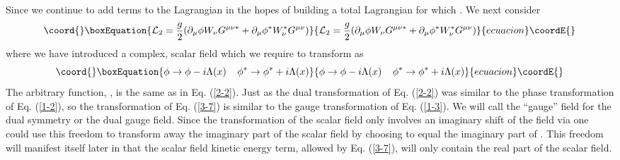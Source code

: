 \documentclass[a4paper,aps]{revtex4}
\begin{document}
Since \coordHE{} we continue to
add terms to the Lagrangian in the hopes of building
a total Lagrangian for which \coordHE{}.
We next consider
\begin{equation}\coord{}\boxEquation{
\label{3-6}
{\cal L} _2 = \frac{g}{2}(\partial _{\mu} \phi W_{\nu} G^{\mu \nu \ast}
+\partial _{\mu} \phi ^{\ast} W_{\nu} ^{\ast} G^{\mu \nu})
}{
{\cal L} _2 = \frac{g}{2}(\partial _{\mu} \phi W_{\nu} G^{\mu \nu \ast}
+\partial _{\mu} \phi ^{\ast} W_{\nu} ^{\ast} G^{\mu \nu})
}{ecuacion}\coordE{}\end{equation}
where we have introduced a complex, scalar field \myHighlight{$\phi$}\coordHE{} which
we require to transform as
\begin{equation}\coord{}\boxEquation{
\label{3-7}
\phi \rightarrow \phi - i \Lambda (x)
\; \; \; \;
\phi^{\ast} \rightarrow \phi ^{\ast} + i \Lambda (x)
}{
\phi \rightarrow \phi - i \Lambda (x)
\; \; \; \;
\phi^{\ast} \rightarrow \phi ^{\ast} + i \Lambda (x)
}{ecuacion}\coordE{}\end{equation}
The arbitrary function, \coordHE{}, is the same
as in Eq. (\ref{2-2}). Just as the dual transformation of
Eq. (\ref{2-2}) was similar to the phase transformation of
Eq. (\ref{1-2}), so the transformation of Eq. (\ref{3-7})
is similar to the gauge transformation of Eq. (\ref{1-3}).
We will call \myHighlight{$\phi$}\coordHE{} the ``gauge'' field for the dual symmetry or
the dual gauge field. Since the transformation of the scalar
field only involves an imaginary shift of the field via
\coordHE{} one could use this freedom to transform
away the imaginary part of the scalar field by choosing
\coordHE{} to equal the imaginary part of \myHighlight{$\phi$}\coordHE{}.
This freedom will manifest itself later in that the
scalar field kinetic energy term, allowed by Eq. (\ref{3-7}),
will only contain the real part of the scalar field.
\end{document}
